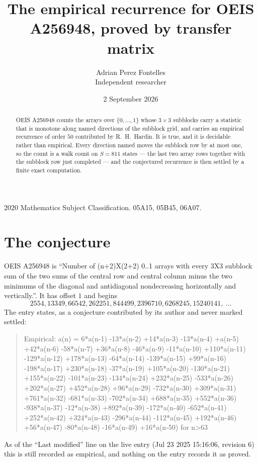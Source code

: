 \documentclass[11pt,a4paper]{article}
\title{The empirical recurrence for OEIS A256948, proved by transfer matrix}
\author{Adrian Perez Fontelles\\ \small Independent researcher}
\date{2 September 2026}
\theoremstyle{plain}
\theoremstyle{definition}
\begin{document}
\maketitle

\begin{abstract}
OEIS A256948 counts the arrays over $\{0,\dots,1\}$ whose $3\times3$ subblocks carry a
statistic that is monotone along named directions of the subblock grid, and carries an
empirical recurrence of order $50$ contributed by R.~H.~Hardin. It is true, and it is
decidable rather than empirical. Every direction named moves the subblock row by at most one,
so the count is a walk count on $S=811$ states --- the last two array rows together with the
subblock row just completed --- and the conjectured recurrence is then settled by a finite
exact computation.
\end{abstract}

\noindent\small 2020 Mathematics Subject Classification. 05A15, 05B45, 06A07.\normalsize

\section{The conjecture}

OEIS A256948 is ``Number of (n+2)X(2+2) 0..1 arrays with every 3X3 subblock sum of the two sums of the central row and central column minus the two minimums of the diagonal and antidiagonal nondecreasing horizontally and vertically.''. It has offset $1$ and begins
\[
2554, 13349, 66542, 262251, 844499, 2396710, 6268245, 15240141,\ \dots
\]
The entry states, as a conjecture contributed by its author and never marked settled:
\begin{quote}
Empirical: a(n) = 6*a(n-1) -13*a(n-2) +14*a(n-3) -13*a(n-4) +a(n-5) +42*a(n-6) -58*a(n-7) +36*a(n-8) -46*a(n-9) -11*a(n-10) +110*a(n-11) -129*a(n-12) +178*a(n-13) -64*a(n-14) -139*a(n-15) +99*a(n-16) -198*a(n-17) +230*a(n-18) -37*a(n-19) +105*a(n-20) -130*a(n-21) +155*a(n-22) -101*a(n-23) -134*a(n-24) +232*a(n-25) -533*a(n-26) +202*a(n-27) +452*a(n-28) +96*a(n-29) -732*a(n-30) +309*a(n-31) +761*a(n-32) -681*a(n-33) -702*a(n-34) +688*a(n-35) +552*a(n-36) -938*a(n-37) -12*a(n-38) +892*a(n-39) -172*a(n-40) -652*a(n-41) +252*a(n-42) +324*a(n-43) -296*a(n-44) -112*a(n-45) +192*a(n-46) +56*a(n-47) -80*a(n-48) -16*a(n-49) +16*a(n-50) for n>63
\end{quote}
As of the ``Last modified'' line on the live entry (Jul 23 2025 15:16:06, revision 6) this is still
recorded as empirical, and nothing on the entry records it as proved.
\end{document}
